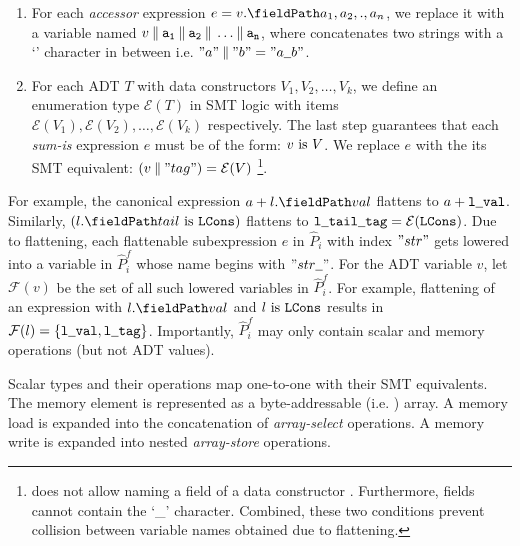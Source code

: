 \begin{enumerate}
\item For each {\em accessor} expression $e = \prodAccess{v}{a_1,a_2,.,a_n}$, we replace it with a
variable named $v \mathbin\Vert{} {{\tt a_1}} \mathbin\Vert{} {{\tt a_2}} \mathbin\Vert{} \dots \mathbin\Vert{} {{\tt a_n}}$,
where \strcat{} concatenates two strings with a `\strsep{}' character in between i.e.
$"a" \strcat{} "b" = "a \strsep{} b"$.

\item For each ADT $T$ with data constructors $V_1,V_2,\dots,V_k$,
we define an enumeration type $\mathcal{E}(T)$ in SMT logic with items
$\mathcal{E}(V_1),\mathcal{E}(V_2),\dots,\mathcal{E}(V_k)$ respectively.
The last step guarantees that each {\em sum-is} expression $e$ must be of the form: $v\ \mathrm{is}\ {\tt \mathnormal{V}}$.
We replace $e$ with the its SMT equivalent: $(v \mathbin\Vert{} "tag") = \mathcal{E}(V)$
\footnote{\SpecL{} does not allow naming a field of a data constructor .
Furthermore, fields cannot contain the `\_' character.
Combined, these two conditions prevent collision between variable names obtained due to flattening.}.
\end{enumerate}

For example, the canonical expression $a + \prodAccess{l}{val}$ flattens to $a + {\tt l \strsep{} val}$.
Similarly, $(\sumIs{\prodAccess{l}{tail}}{LCons})$ flattens to ${\tt l \strsep{} tail \strsep{} tag} = \mathcal{E}(\cons{LCons})$.
Due to flattening, each flattenable subexpression $e$ in $\hat{P}_i$ with index $"str"$ gets lowered
into a variable in $\hat{P}_i^f$ whose name begins with $"str \strsep"$.
For the ADT variable $v$, let $\mathcal{F}(v)$ be the set of all such lowered variables in $\hat{P}_i^f$.
For example, flattening of an expression with $\prodAccess{l}{val}$ and $l\ \mathrm{is}\ {\tt LCons}$
results in $\mathcal{F}(l) = \{ {\tt l \strsep{} val, l \strsep tag} \}$.
Importantly, $\hat{P}_i^f$ may only contain scalar and memory operations (but not ADT values).

Scalar types and their operations map one-to-one with their SMT equivalents.
The memory element \mem{} is represented as a byte-addressable (i.e. ) array.
A memory load  is expanded into the concatenation of  {\em array-select} operations.
A memory write  is expanded into  nested {\em array-store} operations.


